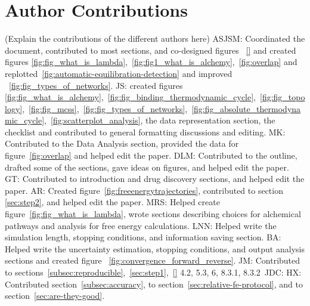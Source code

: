 \documentclass[9pt,bestpractices]{livecoms}
\begin{document}

\clearpage

\clearpage

\section*{Author Contributions}
%
(Explain the contributions of the different authors here)
ASJSM: Coordinated the document, contributed to most sections, and co-designed figures ~\ref{} and created figures \ref{fig:fig_what_is_lambda},~\ref{fig:fig1_what_is_alchemy},~\ref{fig:overlap} and replotted~\ref{fig:automatic-equilibration-detection} and improved ~\ref{fig:fig_types_of_networks}.
JS: created figures \ref{fig:fig_what_is_alchemy},~\ref{fig:fig_binding_thermodynamic_cycle},~\ref{fig:fig_topology},~\ref{fig:fig_mcss},~\ref{fig:fig_types_of_networks},~\ref{fig:fig_absolute_thermodynamic_cycle},~\ref{fig:scatterplot_analysis}, the data representation section, the checklist and contributed to general formatting discussions and editing.
MK: Contributed to the Data Analysis section, provided the data for figure~\ref{fig:overlap} and helped edit the paper.
DLM: Contributed to the outline, drafted some of the sections, gave ideas on figures, and helped edit the paper.
GT: Contributed to introduction and drug discovery sections, and helped edit the paper.
AR: Created figure~\ref{fig:freeenergytrajectories}, contributed to section \ref{sec:step2}, and helped edit the paper.
MRS: Helped create figure~\ref{fig:fig_what_is_lambda}, wrote sections describing choices for alchemical pathways and analysis for free energy calculations.
LNN: Helped write the simulation length, stopping conditions, and information saving section.
BA: Helped write the uncertainty estimation, stopping conditions, and output analysis sections and created figure ~\ref{fig:convergence_forward_reverse}.
JM: Contributed to sections~\ref{subsec:reproducible},~\ref{sec:step1},~\ref{} 4.2, 5.3, 6, 8.3.1, 8.3.2\
JDC: 
HX: Contributed section~\ref{subsec:accuracy}, to section~\ref{sec:relative-fe-protocol}, and to section~\ref{sec:are-they-good}.
\end{document}

